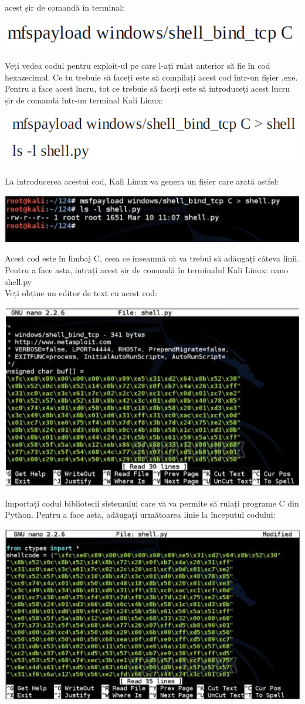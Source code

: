 \documentclass[oneside,20pt]{article}          %
\begin{document}
acest șir de comandă în terminal:
\begin{center}
\includegraphics[height=1 cm]{20.png}
\end{center}
Veți vedea codul pentru exploit-ul pe care l-ați rulat anterior să fie în cod hexazecimal. Ce tu
trebuie să faceți este să compilați acest cod într-un fișier .exe. Pentru a face acest lucru, tot ce trebuie să faceți este să introduceți acest lucru
șir de comandă într-un terminal Kali Linux:
\begin{center}
\includegraphics[height=1 cm]{9.1.png}
\end{center}
La introducerea acestui cod, Kali Linux va genera un fișier care arată astfel:
\begin{center}
\includegraphics[height=2 cm]{12.png}
\end{center}
Acest cod este în limbaj C, ceea ce înseamnă că va trebui să adăugați câteva linii. Pentru a face asta, intrați
acest șir de comandă în terminalul Kali Linux: nano shell.py\\
Veți obține un editor de text cu acest cod:
\begin{center}
\includegraphics[height=4 cm]{13.png}
\end{center}
Importați codul bibliotecii sistemului care vă va permite să rulați programe C din Python. Pentru a face asta,
adăugați următoarea linie la începutul codului:
\begin{center}
\includegraphics[height=4 cm]{14.png}
\end{center}
\end{document}
